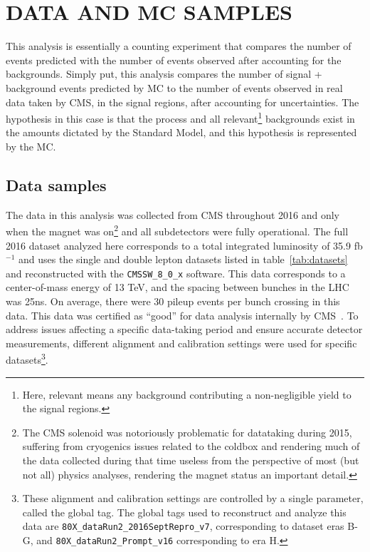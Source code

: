%
%

\chapter{DATA AND MC SAMPLES}
This analysis is essentially a counting experiment that compares the number of \tth events predicted with the number of events observed after accounting for the backgrounds.
Simply put, this analysis compares the number of signal + background events predicted by MC to the number of events observed in real data taken by CMS, in the signal regions, after accounting for uncertainties. 
The hypothesis in this case is that the \tth process and all relevant\footnote{Here, relevant means any background contributing a non-negligible yield to the signal regions.} backgrounds exist in the amounts dictated by
the Standard Model, and this hypothesis is represented by the MC. 

\section{Data samples}
The data in this analysis was collected from CMS throughout 2016 and only when the magnet was on\footnote{The CMS solenoid was notoriously problematic for datataking during 2015,
suffering from cryogenics issues related to the coldbox and rendering much of the data collected during that time useless from the perspective of most (but not all) physics analyses,
rendering the magnet status an important detail.} and all subdetectors were fully operational.
The full 2016 dataset analyzed here corresponds to a total integrated luminosity of 35.9 fb$^{-1}$ and uses the single and double lepton datasets listed in table~\ref{tab:datasets}
and reconstructed with the \texttt{CMSSW\_8\_0\_x} software. This data corresponds to a center-of-mass energy of 13 TeV, and the spacing between bunches in the LHC was 25ns.
On average, there were 30 pileup events per bunch crossing in this data. This data was certified as ``good'' for data analysis internally by CMS~\cite{json}.
To address issues affecting a specific data-taking period and ensure accurate detector measurements, different alignment and calibration settings were used for
specific datasets\footnote{These alignment and calibration settings are controlled by a single parameter, called the global tag. The global tags used to reconstruct and analyze this data are
\texttt{80X\_dataRun2\_2016SeptRepro\_v7}, corresponding to dataset eras B-G, and \texttt{80X\_dataRun2\_Prompt\_v16} corresponding to era H.}. 


